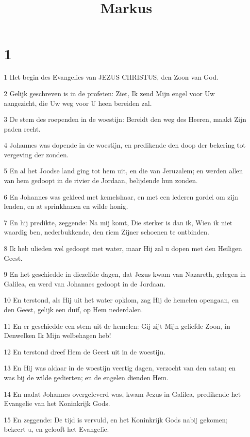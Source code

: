 

\title{Markus}



\chapter{1}

\par 1 Het begin des Evangelies van JEZUS CHRISTUS, den Zoon van God.
\par 2 Gelijk geschreven is in de profeten: Ziet, Ik zend Mijn engel voor Uw aangezicht, die Uw weg voor U heen bereiden zal.
\par 3 De stem des roependen in de woestijn: Bereidt den weg des Heeren, maakt Zijn paden recht.
\par 4 Johannes was dopende in de woestijn, en predikende den doop der bekering tot vergeving der zonden.
\par 5 En al het Joodse land ging tot hem uit, en die van Jeruzalem; en werden allen van hem gedoopt in de rivier de Jordaan, belijdende hun zonden.
\par 6 En Johannes was gekleed met kemelshaar, en met een lederen gordel om zijn lenden, en at sprinkhanen en wilde honig.
\par 7 En hij predikte, zeggende: Na mij komt, Die sterker is dan ik, Wien ik niet waardig ben, nederbukkende, den riem Zijner schoenen te ontbinden.
\par 8 Ik heb ulieden wel gedoopt met water, maar Hij zal u dopen met den Heiligen Geest.
\par 9 En het geschiedde in diezelfde dagen, dat Jezus kwam van Nazareth, gelegen in Galilea, en werd van Johannes gedoopt in de Jordaan.
\par 10 En terstond, als Hij uit het water opklom, zag Hij de hemelen opengaan, en den Geest, gelijk een duif, op Hem nederdalen.
\par 11 En er geschiedde een stem uit de hemelen: Gij zijt Mijn geliefde Zoon, in Denwelken Ik Mijn welbehagen heb!
\par 12 En terstond dreef Hem de Geest uit in de woestijn.
\par 13 En Hij was aldaar in de woestijn veertig dagen, verzocht van den satan; en was bij de wilde gedierten; en de engelen dienden Hem.
\par 14 En nadat Johannes overgeleverd was, kwam Jezus in Galilea, predikende het Evangelie van het Koninkrijk Gods.
\par 15 En zeggende: De tijd is vervuld, en het Koninkrijk Gods nabij gekomen; bekeert u, en gelooft het Evangelie.
